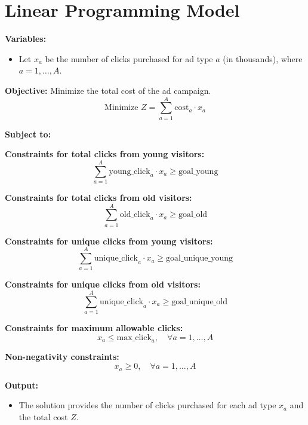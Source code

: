 \documentclass{article}
\begin{document}
\section*{Linear Programming Model}

\textbf{Variables:}
\begin{itemize}
    \item Let \( x_a \) be the number of clicks purchased for ad type \( a \) (in thousands), where \( a = 1, \ldots, A \).
\end{itemize}

\textbf{Objective:} Minimize the total cost of the ad campaign.
\[
\text{Minimize } Z = \sum_{a=1}^{A} \text{cost}_a \cdot x_a
\]

\textbf{Subject to:}

\textbf{Constraints for total clicks from young visitors:}
\[
\sum_{a=1}^{A} \text{young\_click}_{a} \cdot x_a \geq \text{goal\_young}
\]

\textbf{Constraints for total clicks from old visitors:}
\[
\sum_{a=1}^{A} \text{old\_click}_{a} \cdot x_a \geq \text{goal\_old}
\]

\textbf{Constraints for unique clicks from young visitors:}
\[
\sum_{a=1}^{A} \text{unique\_click}_{a} \cdot x_a \geq \text{goal\_unique\_young}
\]

\textbf{Constraints for unique clicks from old visitors:}
\[
\sum_{a=1}^{A} \text{unique\_click}_{a} \cdot x_a \geq \text{goal\_unique\_old}
\]

\textbf{Constraints for maximum allowable clicks:}
\[
x_a \leq \text{max\_click}_{a}, \quad \forall a = 1, \ldots, A
\]

\textbf{Non-negativity constraints:}
\[
x_a \geq 0, \quad \forall a = 1, \ldots, A
\]

\textbf{Output:}
\begin{itemize}
    \item The solution provides the number of clicks purchased for each ad type \( x_a \) and the total cost \( Z \).
\end{itemize}
\end{document}
